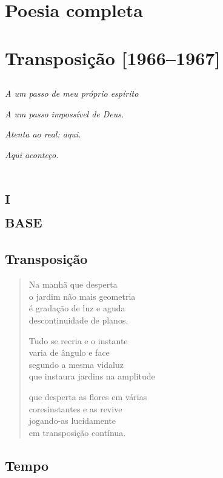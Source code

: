 \part{Poesia completa}

\part{Transposição {[}1966--1967{]}}

\chapter*{}
\thispagestyle{empty}
\mbox{}
\vfill
\hfill\emph{A um passo de meu próprio espírito}

\hfill\emph{A um passo impossível de Deus.}

\hfill\emph{Atenta ao real: aqui.}

\hfill\emph{Aqui aconteço.}

\part*{\textsc{i}\\\textsc{base}}

\chapter{Transposição}

\begin{verse}
Na manhã que desperta\\
o jardim não mais geometria\\
é gradação de luz e aguda\\
descontinuidade de planos.

Tudo se recria e o instante\\
varia de ângulo e face\\
segundo a mesma vidaluz\\
que instaura jardins na amplitude

que desperta as flores em várias\\
coresinstantes e as revive\\
jogando-as lucidamente\\
em transposição contínua.
\end{verse}

\chapter{Tempo}

